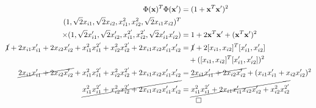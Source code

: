 \documentclass[12pt]{article}
\begin{document}
\section{}
\begin{align*}
	\Phi(\mathbf{x})^T\Phi(\mathbf{x'}) &= (1+\mathbf{x}^T\mathbf{x'})^2\\
	(1, \sqrt{2}x_{i1}, \sqrt{2}x_{i2}, x^{2}_{i1}, x^{2}_{i2}, \sqrt{2}x_{i1}x_{i2})^T &\\
	\times (1, \sqrt{2}x_{i1}', \sqrt{2}x_{i2}', x^{2'}_{i1}, x^{2'}_{i2}, \sqrt{2}x_{i1}'x_{i2}') &= 1 + 2\mathbf{x}^T\mathbf{x'} + (\mathbf{x}^T\mathbf{x'})^2\\
	\cancel{1} + 2x_{i1}x_{i1}' + 2x_{i2}x_{i2}' + x_{i1}^{2}x_{i1}^{2'} + x_{i2}^{2}x_{i2}^{2'} + 2x_{i1}x_{i2}x_{i1}'x_{i2}' &= \cancel{1} + 2 [x_{i1}, x_{i2}]^T[x_{i1}', x_{i2}']\\  &\quad + ([x_{i1}, x_{i2}]^T[x_{i1}', x_{i2}'])^2\\
	\cancel{2x_{i1}x_{i1}' + 2x_{i2}x_{i2}'} + x_{i1}^{2}x_{i1}^{2'} + x_{i2}^{2}x_{i2}^{2'} + 2x_{i1}x_{i2}x_{i1}'x_{i2}' &= \cancel{2x_{i1}x_{i1}' + 2x_{i2}x_{i2}'} + (x_{i1}x_{i1}' + x_{i2}x_{i2}')^2\\
	\cancel{x_{i1}^{2}x_{i1}^{2'} + x_{i2}^{2}x_{i2}^{2'} + 2x_{i1}x_{i2}x_{i1}'x_{i2}'} &=\cancel{x_{i1}^2x_{i1}^{2'} + 2x_{i1}x_{i1}'x_{i2}x_{i2}' + x_{i2}^2x_{i2}^{2'}}\\
	&\qed
\end{align*}
\end{document}
